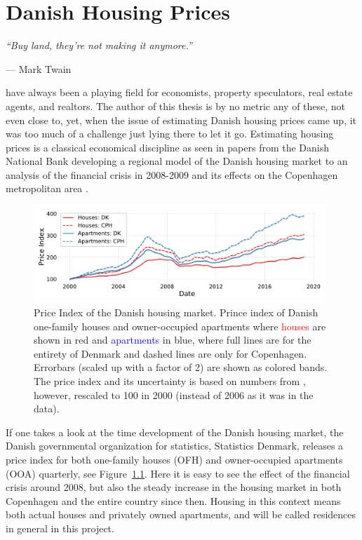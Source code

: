 
\chapter{Danish Housing Prices}
\label{ch:housing_price_analysis}
\epigraph{\textit{``Buy land, they’re not making it anymore.''}}{--- Mark Twain}
 have always been a playing field for economists, property speculators, real estate agents, and realtors. The author of this thesis is by no metric any of these, not even close to, yet, when the issue of estimating Danish housing prices came up, it was too much of a challenge just lying there to let it go. Estimating housing prices is a classical economical discipline as seen in papers from the Danish National Bank developing a regional model of the Danish housing market \autocite{hviidWorkingPaperRegional2017} to an analysis of the financial crisis in \num{2008}-\num{2009} and its effects on the Copenhagen metropolitan area \autocite{mulalicFinancialCrisisDiverging2017}. 

\begin{figure}
  \includegraphics[width=0.98\textwidth, trim=10 15 10 10, clip]{figures/housing_price_index_dst/housingindex_wide.pdf}
  \caption[Danish Housing Price Index]
          {Price Index of the Danish housing market. Prince index of Danish one-family houses and owner-occupied apartments where \textcolor{red}{houses} are shown in red and \textcolor{blue}{apartments} in blue, where full lines are for the entirety of Denmark and dashed lines are only for Copenhagen. Errorbars (scaled up with a factor of 2) are shown as colored bands. The price index and its uncertainty is based on numbers from \citet{dstPriceIndexEJ14}, however, rescaled to 100 in 2000 (instead of 2006 as it was in the data).}
  \label{fig:h:price_index}
\end{figure}

If one takes a look at the time development of the Danish housing market, the Danish governmental organization for statistics, Statistics Denmark, releases a price index \citep{dstPriceIndexEJ14} for both one-family houses (OFH) and owner-occupied apartments (OOA) quarterly, see Figure~\ref{fig:h:price_index}. Here it is easy to see the effect of the financial crisis around 2008, but also the steady increase in the housing market in both Copenhagen and the entire country since then. Housing in this context means both actual houses and privately owned apartments, and will be called residences in general in this project. 

